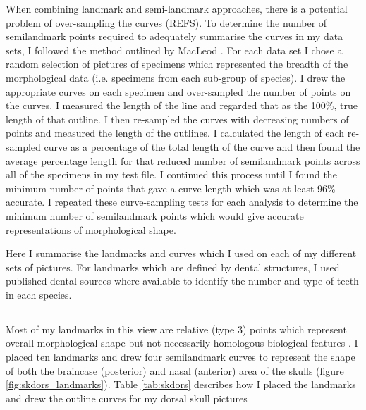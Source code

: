 	When combining landmark and semi-landmark approaches, there is a potential problem of over-sampling the curves (REFS). To determine the number of semilandmark points required to adequately summarise the curves in my data sets,  I followed the method outlined by MacLeod \citeyearpar{MacLeod2012}. For each data set I chose a random selection of pictures of specimens which represented the breadth of the morphological data (i.e. specimens from each sub-group of species). I drew the appropriate curves on each specimen and over-sampled the number of points on the curves. I measured the length of the line and regarded that as the 100\%, true length of that outline. I then re-sampled the curves with decreasing numbers of points and measured the length of the outlines. I calculated the length of each re-sampled curve as a percentage of the total length of the curve and then found the average percentage length for that reduced number of semilandmark points across all of the specimens in my test file. I continued this process until I found the minimum number of points that gave a curve length which was at least 96\% accurate.  I repeated these curve-sampling tests for each analysis to determine the minimum number of semilandmark points which would give accurate representations of morphological shape.
	
	Here I summarise the landmarks and curves which I used on each of my different sets of pictures. For landmarks which are defined by dental structures, I used published dental sources \citep{Repenning1967, Eisenberg1969, Nowak1983, MacPhee1987, KnoxJones1992, Davis1997, Querouil2001, Nagorsen2002, Wilson2005, Goodman2006, Karatas2007, Hoffmann2008, Asher2008, Lin2010,  Muldoon2009, ADW2013} where available to identify the number and type of teeth in each species.
	
\subsection{}
	Most of my landmarks in this view are relative (type 3) points which represent overall morphological shape but not necessarily homologous biological features \citep{Zelditch2012}. I placed ten landmarks and drew four semilandmark curves to represent the shape of both the braincase (posterior) and nasal (anterior) area of the skulls (figure \ref{fig:skdors_landmarks}). Table \ref{tab:skdors} describes how I placed the landmarks and drew the outline curves for my dorsal skull pictures 

